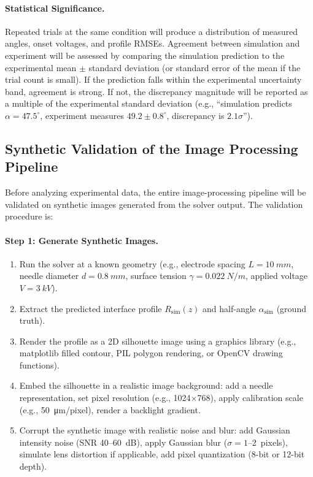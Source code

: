 \paragraph{Statistical Significance.} Repeated trials at the same condition will produce a distribution of measured angles, onset voltages, and profile RMSEs. Agreement between simulation and experiment will be assessed by comparing the simulation prediction to the experimental mean $\pm$ standard deviation (or standard error of the mean if the trial count is small). If the prediction falls within the experimental uncertainty band, agreement is strong. If not, the discrepancy magnitude will be reported as a multiple of the experimental standard deviation (e.g., ``simulation predicts $\alpha = 47.5^{\circ}$, experiment measures $49.2 \pm 0.8^{\circ}$, discrepancy is $2.1 \sigma$'').

\subsection{Synthetic Validation of the Image Processing Pipeline}

Before analyzing experimental data, the entire image-processing pipeline will be validated on synthetic images generated from the solver output. The validation procedure is:

\paragraph{Step 1: Generate Synthetic Images.}
\begin{enumerate}
    \item Run the solver at a known geometry (e.g., electrode spacing $L = \SI{10}{mm}$, needle diameter $d = \SI{0.8}{mm}$, surface tension $\gamma = \SI{0.022}{N/m}$, applied voltage $V = \SI{3}{kV}$).
    \item Extract the predicted interface profile $R_{\mathrm{sim}}(z)$ and half-angle $\alpha_{\mathrm{sim}}$ (ground truth).
    \item Render the profile as a 2D silhouette image using a graphics library (e.g., matplotlib filled contour, PIL polygon rendering, or OpenCV drawing functions).
    \item Embed the silhouette in a realistic image background: add a needle representation, set pixel resolution (e.g., 1024$\times$768), apply calibration scale (e.g., \SI{50}{\micro m/pixel}), render a backlight gradient.
    \item Corrupt the synthetic image with realistic noise and blur: add Gaussian intensity noise (SNR 40--60~dB), apply Gaussian blur ($\sigma = 1$--2~pixels), simulate lens distortion if applicable, add pixel quantization (8-bit or 12-bit depth).
\end{enumerate}

